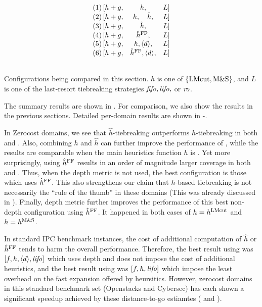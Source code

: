 \begin{table}[htbp]
 \centering
 \[
 \begin{array}{lcll}
  (1)\, [h+g, & h,                           &L] \\\relax
  (2)\, [h+g, & h,     \quad   \hat{h},      &L] \\\relax
  (3)\, [h+g, & \hat{h},                     &L] \\\relax
  (4)\, [h+g, & \hat{h}^{\text{FF}},               &L] \\\relax
  (5)\, [h+g, & h, {\left<d\right>}, &L] \\\relax
  (6)\, [h+g, & \hat{h}^{\text{FF}}, {\left<d\right>}, &L] \\\relax
 \end{array}  
 \]
 \caption{Configurations being compared in this section. $h$ is
 one of ${\left\{\text{LMcut}, \text{M\&S}\right\}}$, and $L$ is one of the last-resort
 tiebreaking strategies ${\text{\textit{fifo}}},{\text{\textit{lifo}}},$ or ${\text{\textit{ro}}}$. }
 \label{list:distance-configs}
\end{table}


The summary results are shown in . For
comparison, we also show the results in the previous sections.
Detailed per-domain results are shown in
-.

In Zerocost domains, we see that $\hat{h}$-tiebreaking outperforms
$h$-tiebreaking in both \lmcut and \mands. Also, combining $h$ and
$\hat{h}$ can further improve the performance of \lmcut, while the
results are comparable when the main heuristics function $h$ is \mands.
Yet more surprisingly, using $\hat{h}^{\text{FF}}$ results in an order of magnitude
larger coverage in both \lmcut and \mands. Thus, when the depth metric
is not used, the best configuration is those which uses $\hat{h}^{\text{FF}}$.
This also strengthens our claim that $h$-based tiebreaking is not
necessarily the ``rule of the thumb'' in these domains
(This was already discussed in ).
Finally, depth metric further improves the performance of this best
non-depth configuration using $\hat{h}^{\text{FF}}$.
It happened in both cases of $h=h^\text{LMcut}$ and $h=h^\text{M\&S}$. 

In standard IPC benchmark instances, the cost of additional computation of
$\hat{h}$ or $\hat{h}^{\text{FF}}$ tends to harm the overall performance.
Therefore, the best result using \lmcut was
$[f,h,{\left<d\right>},{\text{\textit{lifo}}}]$ which uses depth and does not impose the cost of
additional heuristics, and the best result using \mands
was $[f,h,{\text{\textit{lifo}}}]$ which impose the least overhead on the fast expansion offered by
\mands heursitics.
However, 
zerocost domains in this standard benchmark set (Openstacks and
Cybersec) has each shown a significant speedup achieved by these distance-to-go estiamtes
 ( and ).

